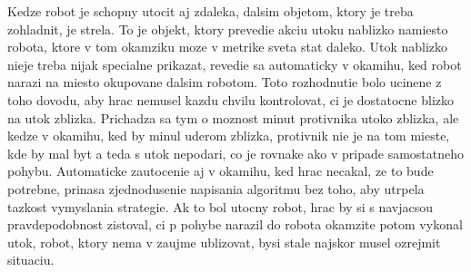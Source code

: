 \documentclass[a4paper,11pt,final]{report}
\begin{document}
Kedze robot je schopny utocit aj zdaleka, dalsim objetom, ktory je treba zohladnit, je strela. To je objekt, ktory prevedie akciu utoku nablizko namiesto robota, ktore v tom okamziku moze v metrike sveta stat daleko. Utok nablizko nieje treba nijak specialne prikazat, revedie sa automaticky v okamihu, ked robot narazi na miesto okupovane dalsim robotom. Toto rozhodnutie bolo ucinene z toho dovodu, aby hrac nemusel kazdu chvilu kontrolovat, ci je dostatocne blizko na utok zblizka. Prichadza sa tym o moznost minut protivnika utoko zblizka, ale kedze v okamihu, ked by minul uderom zblizka, protivnik nie je na tom mieste, kde by mal byt a teda s utok nepodari, co je rovnake ako v pripade samostatneho pohybu. Automaticke zautocenie aj v okamihu, ked hrac necakal, ze to bude potrebne, prinasa zjednodusenie napisania algoritmu bez toho, aby utrpela tazkost vymyslania strategie. Ak to bol utocny robot, hrac by si s navjacsou pravdepodobnost zistoval, ci p pohybe narazil do robota okamzite potom vykonal utok, robot, ktory nema v zaujme ublizovat, bysi stale najskor musel ozrejmit situaciu.
\end{document}
